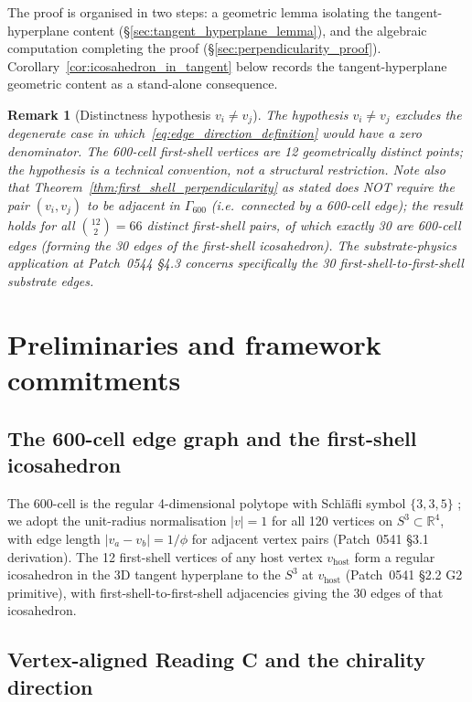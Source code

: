 \documentclass[11pt,letterpaper]{article}
\newtheorem{remark}[theorem]{Remark}
\newcommand{\vhost}{v_{\text{host}}}
\newcommand{\Gsixcell}{\Gamma_{600}}
\newcommand{\Reals}{\mathbb{R}}
\begin{document}
The proof is organised in two steps: a geometric lemma isolating the tangent-hyperplane content (\S\ref{sec:tangent_hyperplane_lemma}), and the algebraic computation completing the proof (\S\ref{sec:perpendicularity_proof}). Corollary~\ref{cor:icosahedron_in_tangent} below records the tangent-hyperplane geometric content as a stand-alone consequence.

\begin{remark}[Distinctness hypothesis $v_i \neq v_j$]\label{rem:distinctness}
The hypothesis $v_i \neq v_j$ excludes the degenerate case in which~\eqref{eq:edge_direction_definition} would have a zero denominator. The 600-cell first-shell vertices are 12 geometrically distinct points; the hypothesis is a technical convention, not a structural restriction. Note also that Theorem~\ref{thm:first_shell_perpendicularity} as stated does NOT require the pair $(v_i, v_j)$ to be adjacent in $\Gsixcell$ (i.e.\ connected by a 600-cell edge); the result holds for all $\binom{12}{2} = 66$ distinct first-shell pairs, of which exactly 30 are 600-cell edges (forming the 30 edges of the first-shell icosahedron). The substrate-physics application at Patch~0544 \S4.3 concerns specifically the 30 first-shell-to-first-shell substrate edges.
\end{remark}

\section{Preliminaries and framework commitments}\label{sec:preliminaries}

\subsection{The 600-cell edge graph and the first-shell icosahedron}\label{sec:first_shell_setup}

The 600-cell is the regular 4-dimensional polytope with Schl{\"a}fli symbol $\{3,3,5\}$ \cite{coxeter1973}; we adopt the unit-radius normalisation $|v|=1$ for all 120 vertices on $S^3 \subset \Reals^4$, with edge length $|v_a - v_b| = 1/\phi$ for adjacent vertex pairs (Patch~0541 \S3.1 derivation). The 12 first-shell vertices of any host vertex $\vhost$ form a regular icosahedron in the 3D tangent hyperplane to the $S^3$ at $\vhost$ (Patch~0541 \S2.2 G2 primitive), with first-shell-to-first-shell adjacencies giving the 30 edges of that icosahedron.

\subsection{Vertex-aligned Reading C and the chirality direction}\label{sec:vertex_aligned_reading_c}
\end{document}

